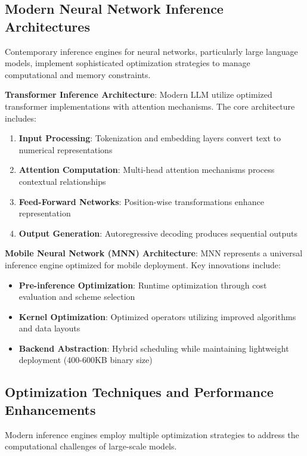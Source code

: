 \documentclass[12pt,a4paper]{article}
\begin{document}
\newpage

\subsection{Modern Neural Network Inference Architectures}
Contemporary inference engines for neural networks, particularly large language models, implement sophisticated optimization strategies to manage computational and memory constraints.

\textbf{Transformer Inference Architecture}: Modern LLM utilize optimized transformer implementations with attention mechanisms. The core architecture includes:

\begin{enumerate}
    \item \textbf{Input Processing}: Tokenization and embedding layers convert text to numerical representations
    \item \textbf{Attention Computation}: Multi-head attention mechanisms process contextual relationships
    \item \textbf{Feed-Forward Networks}: Position-wise transformations enhance representation
    \item \textbf{Output Generation}: Autoregressive decoding produces sequential outputs
\end{enumerate}

\textbf{Mobile Neural Network (MNN) Architecture}: MNN represents a universal inference engine optimized for mobile deployment. Key innovations include:

\begin{itemize}
    \item \textbf{Pre-inference Optimization}: Runtime optimization through cost evaluation and scheme selection
    \item \textbf{Kernel Optimization}: Optimized operators utilizing improved algorithms and data layouts
    \item \textbf{Backend Abstraction}: Hybrid scheduling while maintaining lightweight deployment (400-600KB binary size)
\end{itemize}

\subsection{Optimization Techniques and Performance Enhancements}
Modern inference engines employ multiple optimization strategies to address the computational challenges of large-scale models.
\end{document}
